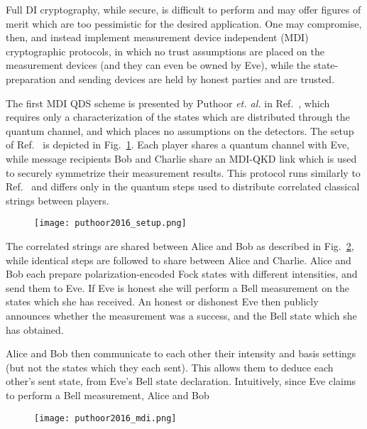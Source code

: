 Full DI cryptography, while secure, is difficult to perform and may offer figures of merit which are too pessimistic for the desired application. One may compromise, then, and instead implement measurement device independent (MDI) cryptographic protocols, in which no trust assumptions are placed on the measurement devices (and they can even be owned by Eve), while the state-preparation and sending devices are held by honest parties and are trusted. 

The first MDI QDS scheme is presented by Puthoor \emph{et. al.} in Ref.~\cite{Puthoor2016}, which requires only a characterization of the states which are distributed through the quantum channel, and which places no assumptions on the detectors. The setup of Ref.~\cite{Puthoor2016} is depicted in Fig.~\ref{fig:puthoor2016_setup}. Each player shares a quantum channel with Eve, while message recipients Bob and Charlie share an MDI-QKD link which is used to securely symmetrize their measurement results. This protocol runs similarly to Ref.~\cite{Amiri2016} and differs only in the quantum steps used to distribute correlated classical strings between players. 

\begin{figure}[htp]
\centering
\texttt{[image: puthoor2016\_setup.png]}
\caption{\label{fig:puthoor2016_setup}}
\end{figure}

The correlated strings are shared between Alice and Bob as described in Fig.~\ref{fig:puthoor2016_mdi}, while identical steps are followed to share between Alice and Charlie. Alice and Bob each prepare polarization-encoded Fock states with different intensities, and send them to Eve. If Eve is honest she will perform a Bell measurement  on the states which she has received. An honest or dishonest Eve then publicly announces whether the measurement was a success, and the Bell state which she has obtained.

Alice and Bob then communicate to each other their intensity and basis settings (but not the states which they each sent). This allows them to deduce each other's sent state, from Eve's Bell state declaration. Intuitively, since Eve claims to perform a Bell measurement, Alice and Bob 

\begin{figure}[htp]
\centering
\texttt{[image: puthoor2016\_mdi.png]}
\caption{\label{fig:puthoor2016_mdi}}
\end{figure}


